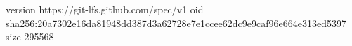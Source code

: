 version https://git-lfs.github.com/spec/v1
oid sha256:20a7302e16da81948dd387d3a62728e7e1ccee62dc9e9caf96e664e313ed5397
size 295568
